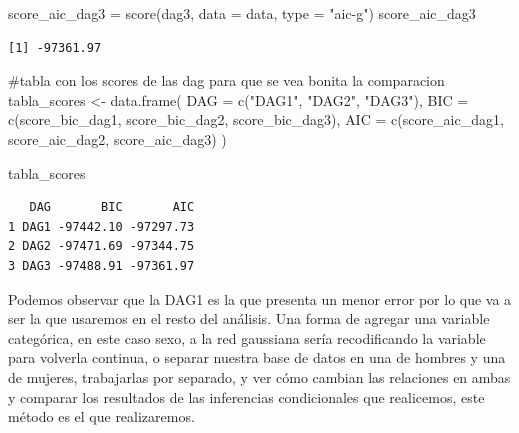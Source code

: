 \documentclass[
  11pt,
  a4paper,
]{article}
\newenvironment{Shaded}{\begin{snugshade}}{\end{snugshade}}
\newcommand{\AttributeTok}[1]{\textcolor[rgb]{0.40,0.45,0.13}{#1}}
\newcommand{\CommentTok}[1]{\textcolor[rgb]{0.37,0.37,0.37}{#1}}
\newcommand{\FunctionTok}[1]{\textcolor[rgb]{0.28,0.35,0.67}{#1}}
\newcommand{\NormalTok}[1]{\textcolor[rgb]{0.00,0.23,0.31}{#1}}
\newcommand{\OtherTok}[1]{\textcolor[rgb]{0.00,0.23,0.31}{#1}}
\newcommand{\StringTok}[1]{\textcolor[rgb]{0.13,0.47,0.30}{#1}}
\begin{document}
\begin{Shaded}
\begin{Highlighting}[numbers=left,,]
\NormalTok{score\_aic\_dag3 }\OtherTok{=} \FunctionTok{score}\NormalTok{(dag3, }\AttributeTok{data =}\NormalTok{ data, }\AttributeTok{type =} \StringTok{"aic{-}g"}\NormalTok{)}
\NormalTok{score\_aic\_dag3}
\end{Highlighting}
\end{Shaded}

\begin{verbatim}
[1] -97361.97
\end{verbatim}

\begin{Shaded}
\begin{Highlighting}[numbers=left,,]
\CommentTok{\#tabla con los scores de las dag para que se vea bonita la comparacion}
\NormalTok{tabla\_scores }\OtherTok{\textless{}{-}} \FunctionTok{data.frame}\NormalTok{(}
  \AttributeTok{DAG =} \FunctionTok{c}\NormalTok{(}\StringTok{"DAG1"}\NormalTok{, }\StringTok{"DAG2"}\NormalTok{, }\StringTok{"DAG3"}\NormalTok{),}
  \AttributeTok{BIC =} \FunctionTok{c}\NormalTok{(score\_bic\_dag1, score\_bic\_dag2, score\_bic\_dag3),}
  \AttributeTok{AIC =} \FunctionTok{c}\NormalTok{(score\_aic\_dag1, score\_aic\_dag2, score\_aic\_dag3)}
\NormalTok{)}

\NormalTok{tabla\_scores}
\end{Highlighting}
\end{Shaded}

\begin{verbatim}
   DAG       BIC       AIC
1 DAG1 -97442.10 -97297.73
2 DAG2 -97471.69 -97344.75
3 DAG3 -97488.91 -97361.97
\end{verbatim}

Podemos observar que la DAG1 es la que presenta un menor error por lo
que va a ser la que usaremos en el resto del análisis. Una forma de
agregar una variable categórica, en este caso sexo, a la red gaussiana
sería recodificando la variable para volverla continua, o separar
nuestra base de datos en una de hombres y una de mujeres, trabajarlas
por separado, y ver cómo cambian las relaciones en ambas y comparar los
resultados de las inferencias condicionales que realicemos, este método
es el que realizaremos.
\end{document}
